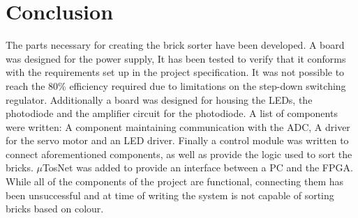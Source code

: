 \section{Conclusion}
The parts necessary for creating the brick sorter have been developed. 
A board was designed for the power supply, It has been tested to verify that it conforms with the requirements set up in the project specification. 
It was not possible to reach the 80\% efficiency required due to limitations on the step-down switching regulator.
Additionally a board was designed for housing the LEDs, the photodiode and the amplifier circuit for the photodiode.
A list of components were written: A component maintaining communication with the ADC, A driver for the servo motor and an LED driver. 
Finally a control module was written to connect aforementioned components, as well as provide the logic used to sort the bricks.
$\mu$TosNet was added to provide an interface between a PC and the FPGA. 
While all of the components of the project are functional, connecting them has been unsuccessful and at time of writing the system is not capable of sorting bricks based on colour.
